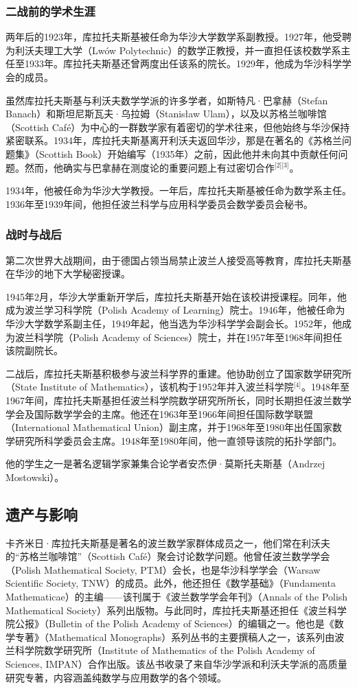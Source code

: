 \subsubsection{二战前的学术生涯}
两年后的1923年，库拉托夫斯基被任命为华沙大学数学系副教授。1927年，他受聘为利沃夫理工大学（Lwów Polytechnic）的数学正教授，并一直担任该校数学系主任至1933年。库拉托夫斯基还曾两度出任该系的院长。1929年，他成为华沙科学学会的成员。

虽然库拉托夫斯基与利沃夫数学学派的许多学者，如斯特凡·巴拿赫（Stefan Banach）和斯坦尼斯瓦夫·乌拉姆（Stanisław Ulam），以及以苏格兰咖啡馆（Scottish Café）为中心的一群数学家有着密切的学术往来，但他始终与华沙保持紧密联系。1934年，库拉托夫斯基离开利沃夫返回华沙，那是在著名的《苏格兰问题集》（Scottish Book）开始编写（1935年）之前，因此他并未向其中贡献任何问题。然而，他确实与巴拿赫在测度论的重要问题上有过密切合作\(^\text{[2][3]}\)。

1934年，他被任命为华沙大学教授。一年后，库拉托夫斯基被任命为数学系主任。1936年至1939年间，他担任波兰科学与应用科学委员会数学委员会秘书。
\subsubsection{战时与战后}
第二次世界大战期间，由于德国占领当局禁止波兰人接受高等教育，库拉托夫斯基在华沙的地下大学秘密授课。

1945年2月，华沙大学重新开学后，库拉托夫斯基开始在该校讲授课程。同年，他成为波兰学习科学院（Polish Academy of Learning）院士。1946年，他被任命为华沙大学数学系副主任，1949年起，他当选为华沙科学学会副会长。1952年，他成为波兰科学院（Polish Academy of Sciences）院士，并在1957年至1968年间担任该院副院长。

二战后，库拉托夫斯基积极参与波兰科学界的重建。他协助创立了国家数学研究所（State Institute of Mathematics），该机构于1952年并入波兰科学院\(^\text{[4]}\)。1948年至1967年间，库拉托夫斯基担任波兰科学院数学研究所所长，同时长期担任波兰数学学会及国际数学学会的主席。他还在1963年至1966年间担任国际数学联盟（International Mathematical Union）副主席，并于1968年至1980年出任国家数学研究所科学委员会主席。1948年至1980年间，他一直领导该院的拓扑学部门。

他的学生之一是著名逻辑学家兼集合论学者安杰伊·莫斯托夫斯基（Andrzej Mostowski）。
\subsection{遗产与影响}
卡齐米日·库拉托夫斯基是著名的波兰数学家群体成员之一，他们常在利沃夫的“苏格兰咖啡馆”（Scottish Café）聚会讨论数学问题。他曾任波兰数学学会（Polish Mathematical Society, PTM）会长，也是华沙科学学会（Warsaw Scientific Society, TNW）的成员。此外，他还担任《数学基础》（Fundamenta Mathematicae）的主编——该刊属于《波兰数学学会年刊》（Annals of the Polish Mathematical Society）系列出版物。与此同时，库拉托夫斯基还担任《波兰科学院公报》（Bulletin of the Polish Academy of Sciences）的编辑之一。他也是《数学专著》（Mathematical Monographs）系列丛书的主要撰稿人之一，该系列由波兰科学院数学研究所（Institute of Mathematics of the Polish Academy of Sciences, IMPAN）合作出版。该丛书收录了来自华沙学派和利沃夫学派的高质量研究专著，内容涵盖纯数学与应用数学的各个领域。

